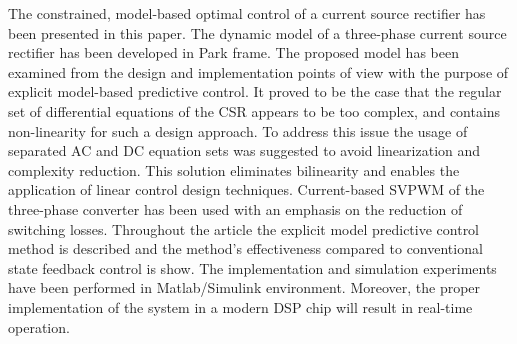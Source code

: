     The constrained, model-based optimal control of a current source rectifier has been presented in this paper. The dynamic model of a three-phase current source rectifier has been developed in Park frame. The proposed model has been examined from the design and implementation points of view with the purpose of explicit model-based predictive control. It proved to be the case that the regular set of differential equations of the CSR appears to be too complex, and contains non-linearity for such a design approach. To address this issue the usage of separated AC and DC equation sets was suggested to avoid linearization and complexity reduction. This solution eliminates bilinearity and enables the application of linear control design techniques. Current-based SVPWM of the three-phase converter has been used with an emphasis on the reduction of switching losses. Throughout the article the explicit model predictive control method is described and the method's effectiveness compared to conventional state feedback control is show. The implementation and simulation experiments have been performed in Matlab/Simulink environment. Moreover, the proper implementation of the system in a modern DSP chip will result in real-time operation. 